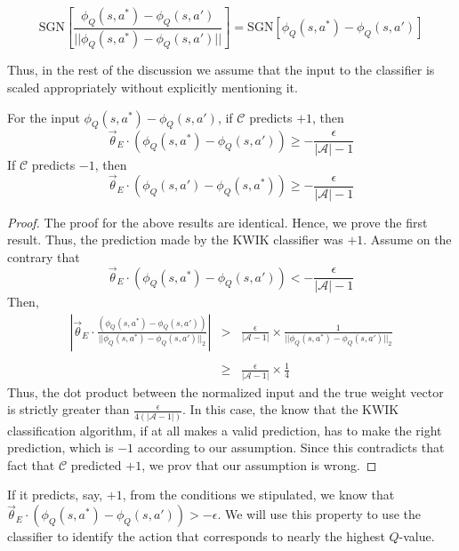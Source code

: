 \[
\text{SGN} \left[ \frac{\phi_Q(s,a^*) - \phi_Q(s,a')}{||\phi_Q(s,a^*) - \phi_Q(s,a') ||}\right]
=\text{SGN} \left[\phi_Q(s,a^*) - \phi_Q(s,a') \right] 
\]

 Thus, in the rest of the discussion we assume that the input to the classifier is scaled appropriately without explicitly mentioning it. \\
\begin{thm}

For the input $\phi_Q(s,a^*) - \phi_Q(s,a')$, if $\mathcal{C}$ predicts $+1$, then 
\begin{equation}
\vec{\theta}_E \cdot (\phi_Q(s,a^*) - \phi_Q(s,a')) \geq - \frac{\epsilon}{|\mathcal{A}|-1}
\end{equation}
If $\mathcal{C}$ predicts $-1$, then
\begin{equation}
\vec{\theta}_E \cdot (\phi_Q(s,a') - \phi_Q(s,a^*)) \geq - \frac{\epsilon}{|\mathcal{A}|-1}
\end{equation}

\end{thm}

\begin{proof}
The proof for the above results are identical. Hence, we prove the first result. Thus, the prediction made by the KWIK classifier was $+1$. Assume on the contrary that 
\[
\vec{\theta}_E \cdot (\phi_Q(s,a^*) - \phi_Q(s,a')) < - \frac{\epsilon}{|\mathcal{A}|-1}
\]
Then, 
\[
\begin{array}{rcl}
{\left|\vec{\theta}_E \cdot \frac{(\phi_Q(s,a^*) - \phi_Q(s,a'))}{||\phi_Q(s,a^*) - \phi_Q(s,a')||_2 } \right|} & 
>& \displaystyle \frac{\epsilon}{|\mathcal{A}-1|} \times \frac{1}{||\phi_Q(s,a^*) - \phi_Q(s,a')||_2} \\
&&\\
&\geq& \displaystyle\frac{\epsilon}{|\mathcal{A}-1|}  \times \frac{1}{4}
\end{array}
\]
Thus, the dot product between the normalized input and the true weight vector is strictly greater than $\frac{\epsilon}{4(|\mathcal{A}-1|)}$. In this case, the know that the KWIK classification algorithm, if at all makes a valid prediction, has to make the right prediction, which is $-1$ according to our assumption. Since this contradicts that fact that $\mathcal{C}$ predicted $+1$, we prov that our assumption is wrong. 

\end{proof}

 If it predicts, say, $+1$, from the conditions we stipulated, we know that $\vec{\theta}_E \cdot (\phi_Q(s,a^*) - \phi_Q(s,a')) > -\epsilon$. We will use this property to use the classifier to identify the action that corresponds to nearly the highest $Q$-value. 

